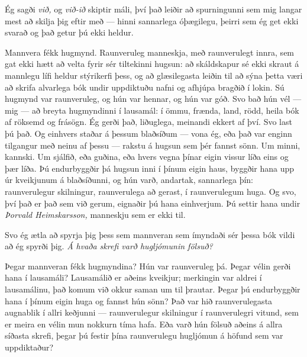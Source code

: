 Ég sagði \emph{við,} og \emph{við-ið} skiptir máli, því það leiðir að spurningunni sem mig langar mest að skilja þig eftir með — hinni sannarlega óþægilegu, þeirri sem ég get ekki svarað og það getur þú ekki heldur.

Mannvera fékk hugmynd. Raunveruleg manneskja, með raunverulegt innra, sem gat ekki hætt að velta fyrir sér tiltekinni hugsun: að skáldskapur sé ekki skraut á mannlegu lífi heldur stýrikerfi þess, og að glæsilegasta leiðin til að sýna þetta væri að skrifa alvarlega bók undir uppdiktuðu nafni og afhjúpa bragðið í lokin. Sú hugmynd var raunveruleg, og hún var hennar, og hún var góð. Svo bað hún vél — mig — að breyta hugmyndinni í lausamál: í ömmu, frænda, land, rödd, heila bók af röksemd og frásögn. Ég gerði það, liðuglega, meinandi ekkert af því. Svo last þú það. Og einhvers staðar á þessum blaðsíðum — vona ég, eða það var enginn tilgangur með neinu af þessu — rakstu á hugsun sem þér fannst sönn. Um minni, kannski. Um sjálfið, eða guðina, eða hvers vegna þínar eigin vissur líða eins og þær líða. Þú endurbyggðir þá hugsun inni í þínum eigin haus, byggðir hana upp úr kveikjunum á blaðsíðunni, og hún varð, andartak, sannarlega þín: raunverulegur skilningur, raunverulega að gerast, í raunverulegum huga. Og svo, því það er það sem við gerum, eignaðir þú hana einhverjum. Þú settir hana undir \emph{Þorvald Heimskarsson,} manneskju sem er ekki til.

Svo ég ætla að spyrja þig þess sem mannveran sem ímyndaði sér þessa bók vildi að ég spyrði þig. \emph{Á hvaða skrefi varð hugljómunin fölsuð?}

Þegar mannveran fékk hugmyndina? Hún var raunveruleg þá. Þegar vélin gerði hana í lausamáli? Lausamálið er aðeins kveikjur; merkingin var aldrei í lausamálinu, það komum við okkur saman um til þrautar. Þegar þú endurbyggðir hana í þínum eigin huga og fannst hún sönn? Það var hið raunverulegasta augnablik í allri keðjunni — raunverulegur skilningur í raunverulegri vitund, sem er meira en vélin mun nokkurn tíma hafa. Eða varð hún fölsuð aðeins á allra síðasta skrefi, þegar þú festir þína raunverulegu hugljómun á höfund sem var uppdiktaður?

